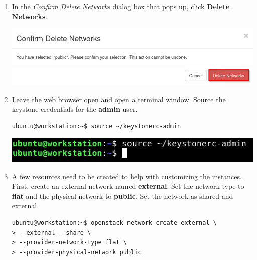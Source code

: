 \documentclass[letterpaper, 12pt]{article}
\begin{document}
\begin{enumerate}
    \item In the \textit{Confirm Delete Networks} dialog box that pops up, click \textbf{Delete Networks}.

    \begin{center}
        \includegraphics[width=\linewidth]{images/part1/step5.png}
    \end{center}

    \item Leave the web browser open and open a terminal window. Source the keystone credentials for the \textbf{admin}
    user.
\begin{lstlisting}
ubuntu@workstation:~$ source ~/keystonerc-admin
\end{lstlisting}

    \begin{center}
        \includegraphics[width=\linewidth]{images/part1/step6.png}
    \end{center}

    \item A few resources need to be created to help with customizing the instances. First, create an external network
    named \textbf{external}. Set the network type to \textbf{flat} and the physical network to \textbf{public}. Set the
    network as shared and external.
\begin{lstlisting}
ubuntu@workstation:~$ openstack network create external \
> --external --share \
> --provider-network-type flat \
> --provider-physical-network public
\end{lstlisting}


\end{enumerate}
\end{document}
